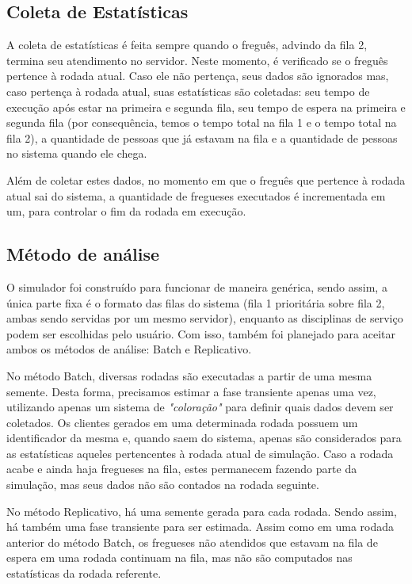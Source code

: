 \documentclass[a4paper,10pt]{article}
\begin{document}
\subsection{Coleta de Estatísticas}

    A coleta de estatísticas é feita sempre quando o freguês, advindo da fila 2, termina seu atendimento no servidor. Neste momento, é verificado se o freguês pertence à rodada atual. Caso ele não pertença, seus dados são ignorados mas, caso pertença à rodada atual, suas estatísticas são coletadas: seu tempo de execução após estar na primeira e segunda fila, seu tempo de espera na primeira e segunda fila (por consequência, temos o tempo total na fila 1 e o tempo total na fila 2), a quantidade de pessoas que já estavam na fila e a quantidade de pessoas no sistema quando ele chega.

    Além de coletar estes dados, no momento em que o freguês que pertence à rodada atual sai do sistema, a quantidade de fregueses executados é incrementada em um, para controlar o fim da rodada em execução.

\subsection{Método de análise}

    O simulador foi construído para funcionar de maneira genérica, sendo assim, a única parte fixa é o formato das filas do sistema (fila 1 prioritária sobre fila 2, ambas sendo servidas por um mesmo servidor), enquanto as disciplinas de serviço podem ser escolhidas pelo usuário. Com isso, também foi planejado para aceitar ambos os métodos de análise: Batch e Replicativo.

    No método Batch, diversas rodadas são executadas a partir de uma mesma semente. Desta forma, precisamos estimar a fase transiente apenas uma vez, utilizando apenas um sistema de \emph{"coloração"} para definir quais dados devem ser coletados. Os clientes gerados em uma determinada rodada possuem um identificador da mesma e, quando saem do sistema, apenas são considerados para as estatísticas aqueles pertencentes à rodada atual de simulação. Caso a rodada acabe e ainda haja fregueses na fila, estes permanecem fazendo parte da simulação, mas seus dados não são contados na rodada seguinte.

    No método Replicativo, há uma semente gerada para cada rodada. Sendo assim, há também uma fase transiente para ser estimada. Assim como em uma rodada anterior do método Batch, os fregueses não atendidos que estavam na fila de espera em uma rodada continuam na fila, mas não são computados nas estatísticas da rodada referente.
\end{document}
